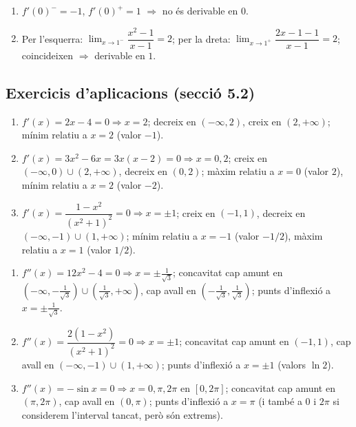 \documentclass[12pt]{article}
\begin{document}
\begin{solucio}
\begin{enumerate}
    \item $f'(0)^- = -1$, $f'(0)^+ = 1$ $\Rightarrow$ no és derivable en $0$.
    \item Per l'esquerra: $\lim_{x\to1^-} \dfrac{x^2-1}{x-1}=2$; per la dreta: $\lim_{x\to1^+} \dfrac{2x-1-1}{x-1}=2$; coincideixen $\Rightarrow$ derivable en $1$.
\end{enumerate}
\end{solucio}

\subsection*{Exercicis d'aplicacions (secció 5.2)}

\begin{solucio}
\begin{enumerate}
    \item $f'(x)=2x-4=0 \Rightarrow x=2$; decreix en $(-\infty,2)$, creix en $(2,+\infty)$; mínim relatiu a $x=2$ (valor $-1$).
    \item $f'(x)=3x^2-6x=3x(x-2)=0 \Rightarrow x=0,2$; creix en $(-\infty,0)\cup(2,+\infty)$, decreix en $(0,2)$; màxim relatiu a $x=0$ (valor $2$), mínim relatiu a $x=2$ (valor $-2$).
    \item $f'(x)=\dfrac{1-x^2}{(x^2+1)^2}=0 \Rightarrow x=\pm1$; creix en $(-1,1)$, decreix en $(-\infty,-1)\cup(1,+\infty)$; mínim relatiu a $x=-1$ (valor $-1/2$), màxim relatiu a $x=1$ (valor $1/2$).
\end{enumerate}
\end{solucio}

\begin{solucio}
\begin{enumerate}
    \item $f''(x)=12x^2-4=0 \Rightarrow x=\pm \frac{1}{\sqrt{3}}$; concavitat cap amunt en $(-\infty,-\frac{1}{\sqrt{3}})\cup(\frac{1}{\sqrt{3}},+\infty)$, cap avall en $(-\frac{1}{\sqrt{3}},\frac{1}{\sqrt{3}})$; punts d'inflexió a $x=\pm \frac{1}{\sqrt{3}}$.
    \item $f''(x)=\dfrac{2(1-x^2)}{(x^2+1)^2}=0 \Rightarrow x=\pm1$; concavitat cap amunt en $(-1,1)$, cap avall en $(-\infty,-1)\cup(1,+\infty)$; punts d'inflexió a $x=\pm1$ (valors $\ln 2$).
    \item $f''(x)=-\sin x=0 \Rightarrow x=0,\pi,2\pi$ en $[0,2\pi]$; concavitat cap amunt en $(\pi,2\pi)$, cap avall en $(0,\pi)$; punts d'inflexió a $x=\pi$ (i també a $0$ i $2\pi$ si considerem l'interval tancat, però són extrems).
\end{enumerate}
\end{solucio}
\end{document}
